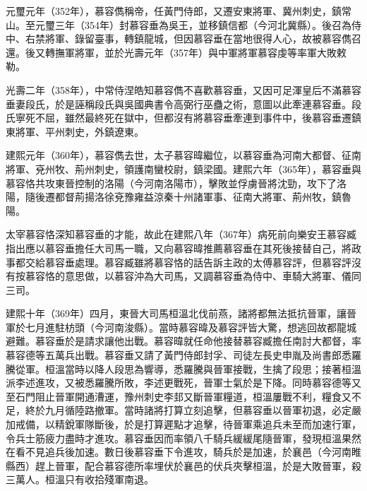 元璽元年（352年），慕容儁稱帝，任黃門侍郎，又遷安東將軍、冀州刺史，鎮常山。至元璽三年（354年）封慕容垂為吳王，並移鎮信都（今河北冀縣）。後召為侍中、右禁將軍、錄留臺事，轉鎮龍城，但因慕容垂在當地很得人心，故被慕容儁召還。後又轉撫軍將軍，並於光壽元年（357年）與中軍將軍慕容虔等率軍大敗敕勒。

光壽二年（358年），中常侍涅皓知慕容儁不喜歡慕容垂，又因可足渾皇后不滿慕容垂妻段氏，於是誣稱段氏與吳國典書令高弼行巫蠱之術，意圖以此牽連慕容垂。段氏寧死不屈，雖然最終死在獄中，但都沒有將慕容垂牽連到事件中，後慕容垂遷鎮東將軍、平州刺史，外鎮遼東。

建熙元年（360年），慕容儁去世，太子慕容暐繼位，以慕容垂為河南大都督、征南將軍、兗州牧、荊州刺史，領護南蠻校尉，鎮梁國。建熙六年（365年），慕容垂與慕容恪共攻東晉控制的洛陽（今河南洛陽市），擊敗並俘虜晉將沈勁，攻下了洛陽，隨後遷都督荊揚洛徐兗豫雍益涼秦十州諸軍事、征南大將軍、荊州牧，鎮魯陽。

太宰慕容恪深知慕容垂的才能，故此在建熙八年（367年）病死前向樂安王慕容臧指出應以慕容垂擔任大司馬一職，又向慕容暐推薦慕容垂在其死後接替自己，將政事都交給慕容垂處理。慕容臧雖將慕容恪的話告訴主政的太傅慕容評，但慕容評沒有按慕容恪的意思做，以慕容沖為大司馬，又調慕容垂為侍中、車騎大將軍、儀同三司。

建熙十年（369年）四月，東晉大司馬桓溫北伐前燕，諸將都無法抵抗晉軍，讓晉軍於七月進駐枋頭（今河南浚縣）。當時慕容暐及慕容評皆大驚，想逃回故都龍城避難。慕容垂於是請求讓他出戰。慕容暐就任命他接替慕容臧擔任南討大都督，率慕容德等五萬兵出戰。慕容垂又請了黃門侍郎封孚、司徒左長史申胤及尚書郎悉羅騰從軍。桓溫當時以降人段思為響導，悉羅騰與晉軍接戰，生擒了段思；接著桓溫派李述進攻，又被悉羅騰所敗，李述更戰死，晉軍士氣於是下降。同時慕容德等又至石門阻止晉軍開通漕運，豫州刺史李邽又斷晉軍糧道，桓溫屢戰不利，糧食又不足，終於九月循陸路撤軍。當時諸將打算立刻追擊，但慕容垂以晉軍初退，必定嚴加戒備，以精銳軍隊斷後，於是打算遲點才追擊，待晉軍乘追兵未至而加速行軍，令兵士筋疲力盡時才進攻。慕容垂因而率領八千騎兵緩緩尾隨晉軍，發現桓溫果然在看不見追兵後加速。數日後慕容垂下令進攻，騎兵於是加速，於襄邑（今河南睢縣西）趕上晉軍，配合慕容德所率埋伏於襄邑的伏兵夾擊桓溫，於是大敗晉軍，殺三萬人。桓溫只有收拾殘軍南退。

